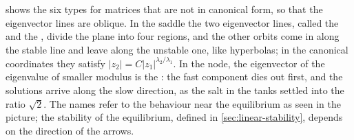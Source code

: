  shows the six types for matrices that are not in canonical form, so that the eigenvector lines are oblique. In the saddle the two eigenvector lines, called the  and the , divide the plane into four regions, and the other orbits come in along the stable line and leave along the unstable one, like hyperbolas; in the canonical coordinates they satisfy $|z_2|=C|z_1|^{\lambda_2/\lambda_1}$. In the node, the eigenvector of the eigenvalue of smaller modulus is the : the fast component dies out first, and the solutions arrive along the slow direction, as the salt in the tanks settled into the ratio $\sqrt2$. The names refer to the behaviour near the equilibrium as seen in the picture; the stability of the equilibrium, defined in \cref{sec:linear-stability}, depends on the direction of the arrows.

